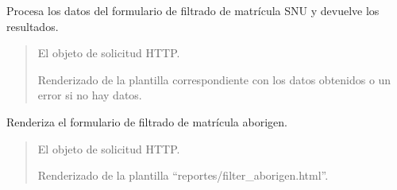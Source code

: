 \documentclass[letterpaper,10pt,spanish]{sphinxmanual}
\begin{document}
\begin{fulllineitems}

\pysigstartsignatures
{}
\pysigstopsignatures
\sphinxAtStartPar
Procesa los datos del formulario de filtrado de matrícula SNU y devuelve los resultados.
\begin{quote}\begin{description}
\sphinxAtStartPar
{} \textendash{} El objeto de solicitud HTTP.

\sphinxAtStartPar
Renderizado de la plantilla correspondiente con los datos obtenidos o un error si no hay datos.

\end{description}\end{quote}

\end{fulllineitems}



\begin{fulllineitems}

\pysigstartsignatures
{}
\pysigstopsignatures
\sphinxAtStartPar
Renderiza el formulario de filtrado de matrícula aborigen.
\begin{quote}\begin{description}
\sphinxAtStartPar
{} \textendash{} El objeto de solicitud HTTP.

\sphinxAtStartPar
Renderizado de la plantilla “reportes/filter\_aborigen.html”.

\end{description}\end{quote}

\end{fulllineitems}
\end{document}
